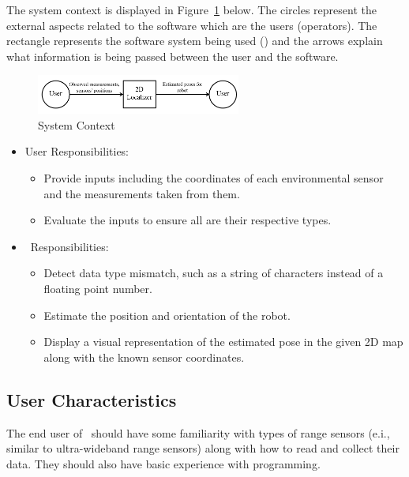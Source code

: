 \documentclass[12pt]{article}
\begin{document}
The system context is displayed in Figure~\ref{Fig_SystemContext} below. The circles represent the external aspects related to the software which are the users (operators). The rectangle represents the software system being used (\progname) and the arrows explain what information is being passed between the user and the software.

\begin{figure}[h!]
\begin{center}
 \includegraphics[width=0.6\textwidth]{SystemContextFigure.png}
\caption{System Context}
\label{Fig_SystemContext} 
\end{center}
\end{figure}
\begin{itemize}
\item User Responsibilities:
\begin{itemize}
\item Provide inputs including the coordinates of each environmental sensor and the measurements taken from them.
\item Evaluate the inputs to ensure all are their respective types.
\end{itemize}
\item \progname~Responsibilities:
\begin{itemize} 
\item Detect data type mismatch, such as a string of characters instead of a
  floating point number.
\item Estimate the position and orientation of the robot.
\item Display a visual representation of the estimated pose in the given 2D map along with the known sensor coordinates.
\end{itemize}
\end{itemize}

\subsection{User Characteristics}\label{SecUserCharacteristics}

The end user of \progname~should have some familiarity with types of range sensors (e.i., similar to ultra-wideband range sensors) along with how to read and collect their data. They should also have basic experience with programming.
\end{document}
